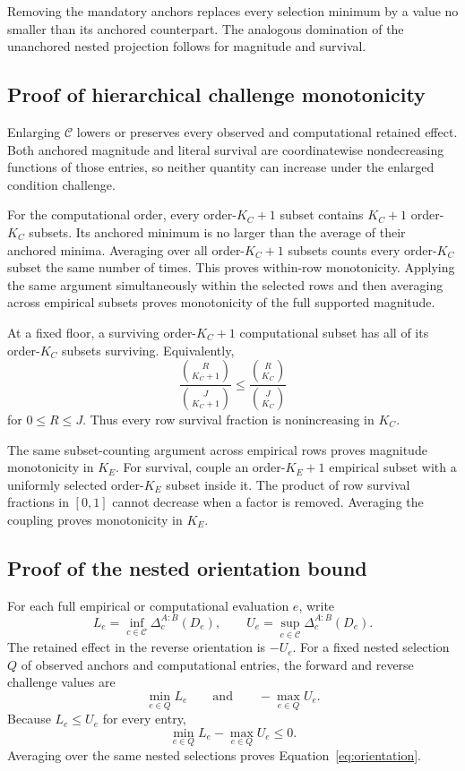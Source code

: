 \documentclass[11pt]{article}
\newcommand{\CSet}{\mathcal{C}}
\theoremstyle{remark}
\begin{document}
Removing the mandatory anchors replaces every selection minimum by a value no
smaller than its anchored counterpart. The analogous domination of the
unanchored nested projection follows for magnitude and survival.

\subsection{Proof of hierarchical challenge monotonicity}
\label{app:proof-monotonicity}

Enlarging $\CSet$ lowers or preserves every observed and computational retained
effect. Both anchored magnitude and literal survival are coordinatewise
nondecreasing functions of those entries, so neither quantity can increase
under the enlarged condition challenge.

For the computational order, every order-$K_C+1$ subset contains
$K_C+1$ order-$K_C$ subsets. Its anchored minimum is no larger than the
average of their anchored minima. Averaging over all order-$K_C+1$ subsets
counts every order-$K_C$ subset the same number of times. This proves
within-row monotonicity. Applying the same argument simultaneously within the
selected rows and then averaging across empirical subsets proves monotonicity
of the full supported magnitude.

At a fixed floor, a surviving order-$K_C+1$ computational subset has all of
its order-$K_C$ subsets surviving. Equivalently,
\[
\frac{\binom{R}{K_C+1}}{\binom{J}{K_C+1}}
\leq
\frac{\binom{R}{K_C}}{\binom{J}{K_C}}
\]
for $0\leq R\leq J$. Thus every row survival fraction is nonincreasing in
$K_C$.

The same subset-counting argument across empirical rows proves magnitude
monotonicity in $K_E$. For survival, couple an order-$K_E+1$ empirical subset
with a uniformly selected order-$K_E$ subset inside it. The product of row
survival fractions in $[0,1]$ cannot decrease when a factor is removed.
Averaging the coupling proves monotonicity in $K_E$.

\subsection{Proof of the nested orientation bound}
\label{app:proof-orientation}

For each full empirical or computational evaluation $e$, write
\[
L_e=\inf_{c\in\CSet}\Delta_c^{A:B}(D_e),
\qquad
U_e=\sup_{c\in\CSet}\Delta_c^{A:B}(D_e).
\]
The retained effect in the reverse orientation is $-U_e$. For a fixed nested
selection $Q$ of observed anchors and computational entries, the forward and
reverse challenge values are
\[
\min_{e\in Q}L_e
\qquad\text{and}\qquad
-\max_{e\in Q}U_e.
\]
Because $L_e\leq U_e$ for every entry,
\[
\min_{e\in Q}L_e-\max_{e\in Q}U_e\leq0.
\]
Averaging over the same nested selections proves
Equation~\eqref{eq:orientation}.
\end{document}
